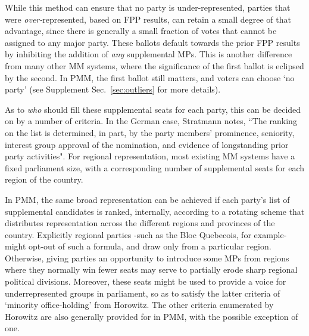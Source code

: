 While this method can ensure that no party is under-represented, parties that were \emph{over-}represented, based on FPP results, can retain a small degree of that advantage, since there is generally a small fraction of votes that cannot be assigned to any major party. These ballots default towards the prior FPP results by inhibiting the addition of \emph{any} supplemental MPs.
This is another difference from many other MM systems, where the significance of the first ballot is eclipsed by the second. In PMM, the first ballot still matters, and voters can choose `no party' (see Supplement Sec.~\ref{sec:outliers} for more details).

As to \emph{who} should fill these supplemental seats for each party, this can be decided on by a number of criteria.
In the German case, Stratmann notes\citep{Stratmann}, ``The ranking on the list is determined, in part, by the party members' prominence, seniority, interest group approval of the nomination, and evidence of longstanding prior party activities".
For regional representation, most existing MM systems have a fixed parliament size, with a corresponding number of supplemental seats for each region of the country.

In PMM, the same broad representation can be achieved if each party's list of supplemental candidates is ranked, internally, according to a rotating scheme that distributes representation across the different regions and provinces of the country.
Explicitly regional parties \--such as the Bloc Quebecois, for example\-- might opt-out of such a formula, and draw only from a particular region.
Otherwise, giving parties an opportunity to introduce some MPs from regions where they normally win fewer seats may serve to partially erode sharp regional political divisions.
Moreover, these seats might be used to provide a voice for underrepresented groups in parliament, so as to satisfy the latter
criteria of `minority office-holding' from Horowitz\citep{Horowitz}. The other criteria enumerated by Horowitz are also generally provided for in PMM, with the possible exception of one.

